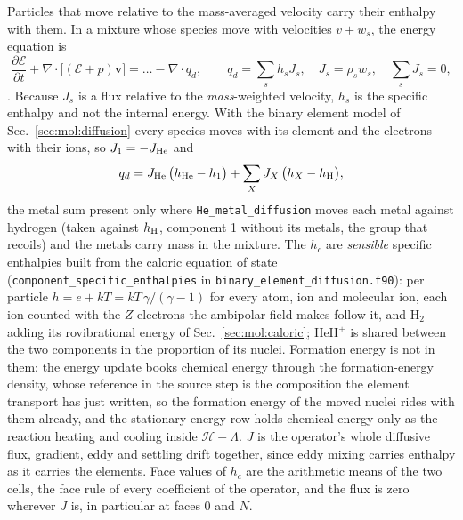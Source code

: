 Particles that move relative to the mass-averaged velocity carry their
enthalpy with them.  In a mixture whose species move with velocities
$v + w_s$, the energy equation is
%
\begin{equation}
  \frac{\partial\mathcal{E}}{\partial t}
  + \nabla\!\cdot\!\bigl[(\mathcal{E}+p)\mathbf{v}\bigr]
  = \ldots - \nabla\!\cdot q_d,
  \qquad
  q_d = \sum_s h_s J_s,\quad J_s = \rho_s w_s,\quad \sum_s J_s = 0,
  \label{eq:mol:qd}
\end{equation}
%
\citep[eqs.~11--13, the Dufour flux and the kinetic energy of the relative
motion left out there and here]{Cook2009}.  Because $J_s$ is a flux relative
to the \emph{mass}-weighted velocity, $h_s$ is the specific enthalpy and not
the internal energy.  With the binary element model of
Sec.~\ref{sec:mol:diffusion} every species moves with its element and the
electrons with their ions, so $J_1 = -J_{\rm He}$ and
%
\begin{equation}
  q_d = J_{\rm He}\,\bigl(h_{\rm He} - h_1\bigr)
      + \sum_X J_X\,\bigl(h_X - h_{\rm H}\bigr),
  \label{eq:mol:qdbinary}
\end{equation}
%
the metal sum present only where \texttt{He\_metal\_diffusion} moves each
metal against hydrogen (taken against $h_{\rm H}$, component 1 without its
metals, the group that recoils) and the metals carry mass in the mixture.
The $h_c$ are \emph{sensible} specific enthalpies built from the caloric
equation of state (\texttt{component\_specific\_enthalpies} in
\texttt{binary\_element\_diffusion.f90}): per particle
$h = e + kT = kT\,\gamma/(\gamma-1)$ for every atom, ion and molecular ion,
each ion counted with the $Z$ electrons the ambipolar field makes follow it,
and H$_2$ adding its rovibrational energy of Sec.~\ref{sec:mol:caloric};
HeH$^+$ is shared between the two components in the proportion of its
nuclei.  Formation energy is not in them: the energy update books chemical
energy through the formation-energy density, whose reference in the source
step is the composition the element transport has just written, so the
formation energy of the moved nuclei rides with them already, and the
stationary energy row holds chemical energy only as the reaction heating and
cooling inside $\mathcal{H}-\Lambda$.  $J$ is the operator's whole diffusive
flux, gradient, eddy and settling drift together, since eddy mixing carries
enthalpy as it carries the elements.  Face values of $h_c$ are the
arithmetic means of the two cells, the face rule of every coefficient of the
operator, and the flux is zero wherever $J$ is, in particular at faces 0 and
$N$.

